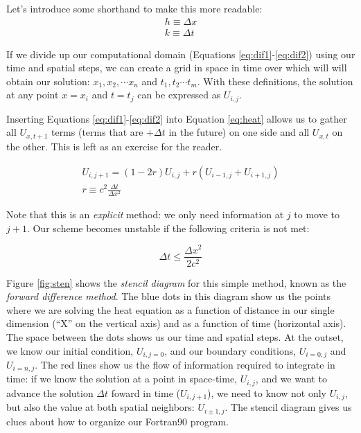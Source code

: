 \documentclass[11pt, letterpaper]{article}
\begin{document}
Let's introduce some shorthand to make this more readable:
\begin{gather}
  h \equiv \Delta x \\
  k \equiv \Delta t
\end{gather}

If we divide up our computational domain (Equations \ref{eq:dif1}-\ref{eq:dif2}) using our
time and spatial steps, we can create a grid in space in time over which will
will obtain our solution: $x_1, x_2, \cdots x_n$ and $t_1, t_2 \cdots t_m$.
With these definitions, the solution at any point $x=x_i$ and $t=t_j$
can be expressed as $U_{i, j}$.

Inserting Equations \ref{eq:dif1}-\ref{eq:dif2} into Equation \ref{eq:heat} allows us to
gather all $U_{x,t+1}$ terms (terms that are $+\Delta t$ in the future) on
one side and all $U_{x,t}$ on the other.  This is left as an exercise for the
reader.

\begin{gather}
  \label{eq:scheme}
  U_{i, j+1} = \left(1-2r\right)U_{i,j}+r\left(U_{i-1,j}+U_{i+1,j}\right)\\
  r \equiv c^2 \frac{\Delta t}{\Delta x^2}
\end{gather}

Note that this is an \emph{explicit} method: we only need information at
$j$ to move to $j+1$.  Our scheme becomes unstable if the following criteria is
not met:

\begin{equation}
  \label{eq:cfl}
  \Delta t \leq \frac{\Delta x^2}{2c^2}
\end{equation}

Figure \ref{fig:sten} shows the \emph{stencil diagram} for this simple method,
known as the \emph{forward difference method}.  The blue dots in this
diagram show us the points where we are solving the heat equation as a function
of distance in our single dimension (``X'' on the vertical axis) and as
a function of time (horizontal axis).  The space between the dots shows us
our time and spatial steps.  At the outset, we know our initial condition,
$U_{i, j=0}$, and our boundary conditions, $U_{i=0, j}$ and $U_{i=n, j}$.
The red lines show us the flow of information
required to integrate in time: if we know the solution at a point in space-time,
$U_{i,j}$, and we want to advance the solution $\Delta t$ foward in time
($U_{i,j+1}$), we need to know not only $U_{i,j}$, but also the value at both
spatial neighbors: $U_{i\pm1,j}$.  The stencil diagram gives us clues about
how to organize our Fortran90 program.
\end{document}
